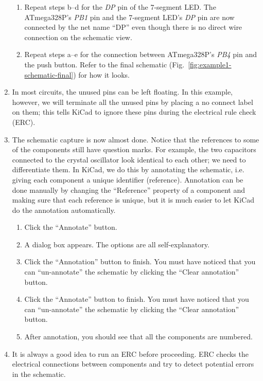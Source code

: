 \documentclass[12pt,letterpaper]{scrartcl}
\begin{document}
\begin{enumerate}
\begin{enumerate}
			\item Repeat steps b--d for the \emph{DP} pin of the 7-segment LED. The ATmega328P's \emph{PB1} pin and the 7-segment LED's \emph{DP} pin are now connected by the net name ``DP'' even though there is no direct wire connection on the schematic view. 
			\item Repeat steps a--e for the connection between ATmega328P's \emph{PB4} pin and the push button. Refer to the final schematic (Fig.~\ref{fig:example1-schematic-final}) for how it looks.  
		\end{enumerate}
	
	\item In most circuits, the unused pins can be left floating. In this example, however, we will terminate all the unused pins by placing a no connect label on them; this tells KiCad to ignore these pins during the electrical rule check (ERC).
	
	\item The schematic capture is now almost done. Notice that the references to some of the components still have question marks. For example, the two capacitors connected to the crystal oscillator look identical to each other; we need to differentiate them. In KiCad, we do this by annotating the schematic, i.e. giving each component a unique identifier (reference). Annotation can be done manually by changing the ``Reference'' property of a component and making sure that each reference is unique, but it is much easier to let KiCad do the annotation automatically. 
		\begin{enumerate}
			\item Click the ``Annotate'' button. 
			\item A dialog box appears. The options are all self-explanatory. 
			\item Click the ``Annotation'' button to finish. You must have noticed that you can ``un-annotate'' the schematic by clicking the ``Clear annotation'' button. 
			\item Click the ``Annotate'' button to finish. You must have noticed that you can ``un-annotate'' the schematic by clicking the ``Clear annotation'' button. 
			\item After annotation, you should see that all the components are numbered. 
		\end{enumerate}
	\item It is always a good idea to run an ERC before proceeding. ERC checks the electrical connections between components and try to detect potential errors in the schematic.
	

\end{enumerate}
\end{document}
